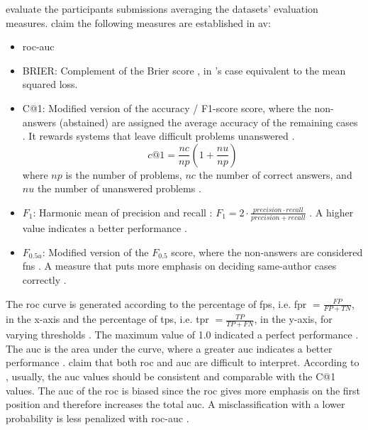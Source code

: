 \citet{ayele_overview_2024,bevendorff_overview_2024} evaluate the participants submissions averaging the datasets' evaluation measures.
\citet{ayele_overview_2024} claim the following measures are established in \ac{av}:
\begin{itemize}
    \item \ac{roc-auc} \citep{bevendorff_overview_2024,weerasinghe_feature_vector_difference_2021,kocher_unine_2015}
    
    \item BRIER: Complement of the Brier score \citep{bevendorff_overview_2024,weerasinghe_feature_vector_difference_2021}, in \citet{bevendorff_overview_2024}'s case equivalent to the mean squared loss.
    
    \item C@1: Modified version of the accuracy \citep{bevendorff_overview_2024}/ F1-score \citep{weerasinghe_feature_vector_difference_2021} score, 
    where the non-answers (abstained) \citep{llm_detection_av_2025} are assigned the average accuracy of the remaining cases \citep{bevendorff_overview_2024}. 
    It rewards systems that leave difficult problems unanswered \citep{weerasinghe_feature_vector_difference_2021}.
    $$c@1 = \frac{nc}{np}(1+\frac{nu}{np})$$ where $np$ is the number of problems, $nc$ the number of correct answers, 
    and $nu$ the number of unanswered problems \citep{kocher_unine_2015}.
    
    \item $F_1$: Harmonic mean of precision and recall \citep{bevendorff_overview_2024,weerasinghe_feature_vector_difference_2021}:
    $ F_1 = 2 \cdot \frac{precision \cdot recall}{precision + recall} $ \citep{neal_surveying_2018}.
    A higher value indicates a better performance \citep{neal_surveying_2018}.
    
    \item $F_{0.5u}$: Modified version of the $F_{0.5}$ score, where the non-answers are considered \acp{fn} \citep{bevendorff_overview_2024}. A measure that puts more emphasis on deciding same-author cases correctly \citep{weerasinghe_feature_vector_difference_2021}.
\end{itemize}

The \ac{roc} curve is generated according to the percentage of \acp{fp}, i.e. \ac{fpr} $= \frac{FP}{FP+TN}$, in the x-axis and 
the percentage of \acp{tp}, i.e. \ac{tpr} $=\frac{TP}{TP+FN}$, in the y-axis,
for varying thresholds \citep{kocher_unine_2015,neal_surveying_2018}.
The maximum value of 1.0 indicated a perfect performance \citep{kocher_unine_2015}.
The \ac{auc} is the area under the curve, where a greater \ac{auc} indicates a better performance \citep{neal_surveying_2018}.
\citet{kocher_unine_2015} claim that both \ac{roc} and \ac{auc} are difficult to interpret.
According to \citet{kocher_unine_2015}, usually, the \ac{auc} values should be consistent and comparable with the C@1 values.
The \ac{auc} of the \ac{roc} is biased since the \ac{roc} gives more emphasis 
on the first position and therefore increases the total \ac{auc}.
A misclassification with a lower probability is less penalized with \ac{roc-auc} \citep{kocher_unine_2015}.

